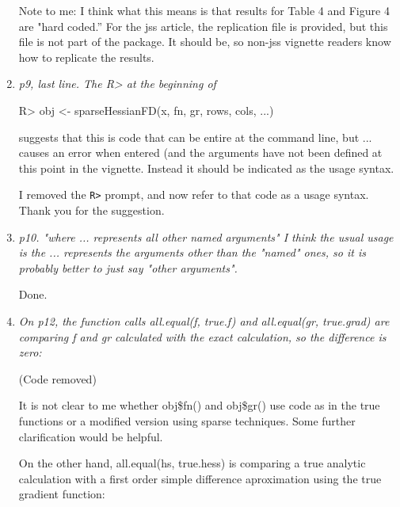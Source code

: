 \documentclass{article}
\newcommand{\code}[1]{\texttt{#1}}
\newcommand{\func}[1]{\code{#1}}
\newenvironment{revQuote}{\itshape}{\vspace{\baselineskip}}
\newenvironment{response}{\normalfont}{\vspace{\baselineskip}}
\begin{document}
\begin{enumerate}[align=left]
\begin{response}
  Note to me:  I think what this means is that results for Table 4 and
  Figure 4 are "hard coded.''  For the jss article, the replication
  file is provided, but this file is not part of the package.  It
  should be, so non-jss vignette readers know how to replicate the results. 
\end{response}


\item \begin{revQuote}
p9, last line. The R> at the beginning of
 
   R> obj <- sparseHessianFD(x, fn, gr, rows, cols, ...)

suggests that this is code that can be entire at the command line, but ...
causes an error when entered (and the arguments have not been defined at
this point in the vignette. Instead it should be indicated as the usage
syntax.
  \end{revQuote}

\begin{response}
  I removed the \func{R>} prompt, and now refer to that code as a usage
  syntax.  Thank you for the suggestion.
\end{response}


\item \begin{revQuote}
p10. "where ... represents all other named arguments"
   I think the usual usage is the ... represents the arguments other than
the "named" ones, so it is probably better to just say "other arguments".
\end{revQuote}

\begin{response}
  Done.
\end{response}


\item \begin{revQuote}
On p12, the function calls all.equal(f, true.f) and all.equal(gr,
true.grad) are comparing f and gr calculated with the exact calculation, so
the difference is zero:


(Code removed)


It is not clear to me whether obj\$fn() and obj\$gr() use code as in the true
functions or a modified version using sparse techniques. Some further
clarification would be helpful.

On the other hand, all.equal(hs, true.hess) is comparing a true analytic
calculation with a first order simple difference aproximation using the true
gradient function:


\end{revQuote}
\end{enumerate}
\end{document}
